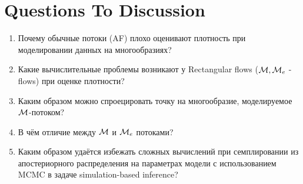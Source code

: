 \section{Questions To Discussion}
\begin{enumerate}
    \item Почему обычные потоки (AF) плохо оценивают плотность при моделировании данных на многообразиях?
    \item Какие вычислительные проблемы возникают у Rectangular flows ($\mathcal{M}, \mathcal{M}_e$ - flows) при оценке плотности?
    \item Каким образом можно спроецировать точку на многообразие, моделируемое $\mathcal{M}$-потоком?
    \item В чём отличие между $\mathcal{M}$ и $\mathcal{M}_{e}$ потоками?
    \item Каким образом удаётся избежать сложных вычислений при семплировании из апостериорного распределения на параметрах модели с использованием MCMC в задаче simulation-based inference?
\end{enumerate}